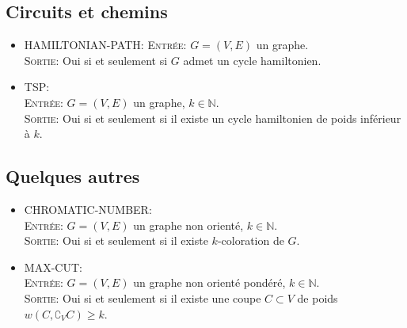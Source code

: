 \subsection*{Circuits et chemins}
\begin{itemize}
\item HAMILTONIAN-PATH:
  \textsc{Entrée}: $G = (V, E)$ un graphe. \\
  \textsc{Sortie}: Oui si et seulement si $G$ admet un cycle hamiltonien.\\
\item TSP: \\
  \textsc{Entrée}: $G = (V, E)$ un graphe, $k\in \mathbb{N}$. \\
  \textsc{Sortie}: Oui si et seulement si il existe un cycle
  hamiltonien de poids inférieur à $k$.\\

\end{itemize}

\subsection*{Quelques autres}
\begin{itemize}
\item CHROMATIC-NUMBER: \\
  \textsc{Entrée}: $G = (V, E)$ un graphe non orienté, $k\in \mathbb{N}$. \\
  \textsc{Sortie}: Oui si et seulement si il existe $k$-coloration de $G$.\\

\item MAX-CUT: \\
  \textsc{Entrée}: $G = (V, E)$ un graphe non orienté pondéré, $k\in \mathbb{N}$. \\
  \textsc{Sortie}: Oui si et seulement si il existe une coupe
  $C \subset V$ de poids $w(C, \complement_{V}C) \geq k$.\\
\end{itemize}
